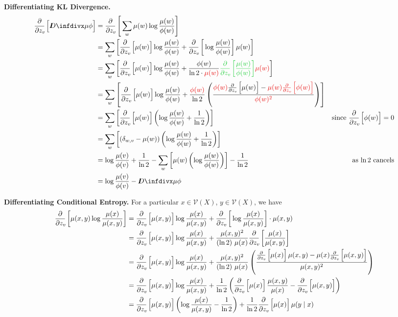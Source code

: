 \documentclass{article}
\newcommand{\V}{\mathcal V}
\begin{document}
	\textbf{Differentiating KL Divergence.}
	\begin{align*}
		\pz{\kldiv{\mu}{\phi}} &= \pz{\sum_w \mu(w) \log \frac{\mu(w)}{\phi(w)}} \\
			&= \sum_w \left[ \pz{\mu(w)} \log \frac{\mu(w)}{\phi(w)} + \pz{\log\frac{\mu(w)}{\phi(w)} }\mu(w) \right] \\
			&=\sum_w \left[ \pz{\mu(w)} \log \frac{\mu(w)}{\phi(w)} + \frac{\phi(w)}{\ln 2\cdot\color{eliminate}\mu(w)} {\color{expand}\pz{\frac{\mu(w)}{\phi(w)}}} {\color{eliminate}\mu(w)} \right] \\
			&=\sum_w \left[ \pz{\mu(w)} \log \frac{\mu(w)}{\phi(w)} + \frac{\color{eliminate}\phi(w)}{\ln 2} 	\left(\frac{{\color{eliminate}\phi(w)} \pz{\mu(w)} - {\color{eliminate}\mu(w) \pz{\phi(w)}}}{\color{eliminate}\phi(w)^2}\right)  \right] \\
			&=\sum_w \left[ \pz{\mu(w)} \left(\log \frac{\mu(w)}{\phi(w)} + \frac{1}{\ln 2} \right) \right] & \text{since $\pz{\phi(w)} = 0$}\\
			&=\sum_w \left[ (\delta_{w,v} - \mu(w)) \left(\log \frac{\mu(w)}{\phi(w)} + \frac{1}{\ln 2} \right) \right] \\
			&= \log \frac{\mu(v)}{\phi(v)} + \frac{1}{\ln 2} - \sum_w \left[ \mu(w) \left(\log \frac{\mu(w)}{\phi(w)}  \right) \right] - \frac{1}{\ln 2} 
				&\text{as $\ln 2$ cancels}\\
			&= \log \frac{\mu(v)}{\phi(v)} - \kldiv{\mu}{\phi} \\
	\end{align*}
	
	\textbf{Differentiating Conditional Entropy.}
	For a particular $x \in \V(X)$, $y \in \V(X)$, we have
	\begin{align*}
		\pz{\mu(x,y) \log \frac{\mu(x)}{\mu(x,y)}}
		&= \pz{\mu(x,y)} \log \frac{\mu(x)}{\mu(x,y)} + \pz{\log \frac{\mu(x)}{\mu(x,y)}} \cdot \mu(x,y) \\
		&= \pz{\mu(x,y)} \log \frac{\mu(x)}{\mu(x,y)} + \frac{\mu(x,y)^2}{(\ln 2)\ \mu(x) } \pz{\frac{\mu(x)}{\mu(x,y)}} \\
		&= \pz{\mu(x,y)} \log \frac{\mu(x)}{\mu(x,y)} + \frac{\mu(x,y)^2}{(\ln 2)\ \mu(x) } \left(\frac{ \pz{\mu(x)} \mu(x,y) - \mu(x) \pz{\mu(x,y)}}{\mu(x,y)^2} \right) \\
		&= \pz{\mu(x,y)} \log \frac{\mu(x)}{\mu(x,y)} + \frac{1}{\ln 2} \left( \pz{\mu(x)} \frac{\mu(x,y)}{\mu(x)} - \pz{\mu(x,y)} \right) \\
		&= \pz{\mu(x,y)} \left(\log \frac{\mu(x)}{\mu(x,y)} - \frac{1}{\ln 2}\right) +  \frac{1}{\ln 2} \pz{\mu(x)} \mu(y \mid x) \\
	\end{align*}
	
\end{document}
